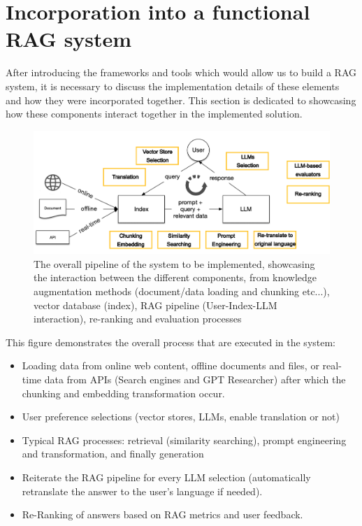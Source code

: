 \section{Incorporation into a functional RAG system}
After introducing the frameworks and tools which would allow us to build a RAG system, it is necessary to discuss the implementation details of these elements and how they were incorporated together.\newline
This section is dedicated to showcasing how these components interact together in the implemented solution.
\begin{figure}[htbp]
    \centering
    \includegraphics[width=\linewidth]{./figures/rag_components.png}
    \caption{The overall pipeline of the system to be implemented, showcasing the interaction between the different components, from knowledge augmentation methods (document/data loading and chunking etc...), vector database (index), RAG pipeline (User-Index-LLM interaction), re-ranking and evaluation processes}
\end{figure}\newline
This figure demonstrates the overall process that are executed in the system:
\begin{itemize}
    \item Loading data from online web content, offline documents and files, or real-time data from APIs (Search engines and GPT Researcher) after which the chunking and embedding transformation occur.
    \item User preference selections (vector stores, LLMs, enable translation or not)
    \item Typical RAG processes: retrieval (similarity searching), prompt engineering and transformation, and finally generation
    \item Reiterate the RAG pipeline for every LLM selection (automatically retranslate the answer to the user's language if needed).
    \item Re-Ranking of answers based on RAG metrics and user feedback.
\end{itemize}
\newpage


